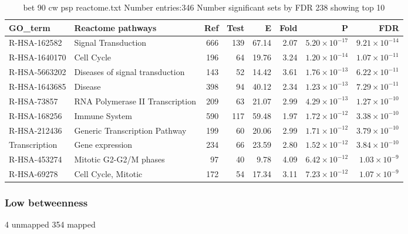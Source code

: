 \begin{table}[ht]
\centering
\begin{adjustbox}{width=\textwidth}
\begin{tabular}{llrrrrrr}
  \hline
GO\_term & Reactome pathways & Ref & Test & E & Fold & P & FDR \\ 
  \hline
R-HSA-162582 & Signal Transduction  & 666 & 139 & 67.14 & 2.07 & $5.20 \times 10^{-17}$ & $9.21 \times 10^{-14}$ \\ 
  R-HSA-1640170 & Cell Cycle  & 196 & 64 & 19.76 & 3.24 & $1.20 \times 10^{-14}$ & $1.07 \times 10^{-11}$ \\ 
  R-HSA-5663202 & Diseases of signal transduction  & 143 & 52 & 14.42 & 3.61 & $1.76 \times 10^{-13}$ & $6.22 \times 10^{-11}$ \\ 
  R-HSA-1643685 & Disease  & 398 & 94 & 40.12 & 2.34 & $1.23 \times 10^{-13}$ & $7.29 \times 10^{-11}$ \\ 
  R-HSA-73857 & RNA Polymerase II Transcription  & 209 & 63 & 21.07 & 2.99 & $4.29 \times 10^{-13}$ & $1.27 \times 10^{-10}$ \\ 
  R-HSA-168256 & Immune System  & 590 & 117 & 59.48 & 1.97 & $1.72 \times 10^{-12}$ & $3.38 \times 10^{-10}$ \\ 
  R-HSA-212436 & Generic Transcription Pathway  & 199 & 60 & 20.06 & 2.99 & $1.71 \times 10^{-12}$ & $3.79 \times 10^{-10}$ \\ 
  Transcription  & Gene expression  & 234 & 66 & 23.59 & 2.80 & $1.52 \times 10^{-12}$ & $3.84 \times 10^{-10}$ \\ 
  R-HSA-453274 & Mitotic G2-G2/M phases  & 97 & 40 & 9.78 & 4.09 & $6.42 \times 10^{-12}$ & $1.03 \times 10^{-9}$ \\ 
  R-HSA-69278 & Cell Cycle, Mitotic  & 172 & 54 & 17.34 & 3.11 & $7.23 \times 10^{-12}$ & $1.07 \times 10^{-9}$ \\ 
  \hline
\end{tabular}
\end{adjustbox}
\caption{bet 90 cw psp reactome.txt Number entries:346 Number significant sets by FDR 238 showing top 10} 
\label{tab:bet 90 cw psp reactome.txt Number entries:346 Number significant sets by FDR 238 showing top 10}
\end{table}

\clearpage
\subsubsection{Low betweenness}
4 unmapped 354 mapped

